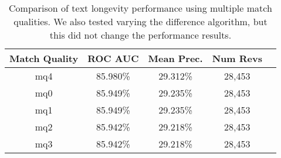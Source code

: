 \begin{table}[tbph]
\begin{center}
\begin{tabular}{|c|c||c|c|c|}
\hline
Match Quality & ROC AUC & Mean Prec. & Num Revs \\
\hline
\hline
mq4 & 85.980\% & 29.312\% & 28,453 \\
mq0 & 85.949\% & 29.235\% & 28,453 \\
mq1 & 85.949\% & 29.235\% & 28,453 \\
mq2 & 85.942\% & 29.218\% & 28,453 \\
mq3 & 85.942\% & 29.218\% & 28,453 \\
\hline
\end{tabular}
\end{center}
\caption{Comparison of text longevity performance using
    multiple match qualities.  We also tested varying
    the difference algorithm, but this did not change
    the performance results.}
\label{tab:textlongeval}
\end{table}

